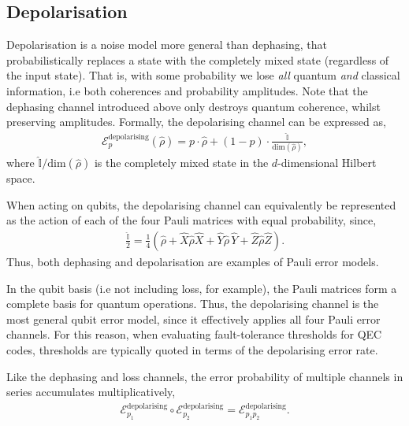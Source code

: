 %
%

\subsection{Depolarisation} 

Depolarisation is a noise model more general than dephasing, that probabilistically replaces a state with the completely mixed state (regardless of the input state). That is, with some probability we lose \textit{all} quantum \textit{and} classical information, i.e both coherences and probability amplitudes. Note that the dephasing channel introduced above only destroys quantum coherence, whilst preserving amplitudes. Formally, the depolarising channel can be expressed as,
\begin{align} \label{eq:depolarizing_channel}
\mathcal{E}^\mathrm{depolarising}_p(\hat\rho) = p \cdot \hat\rho + (1-p)\cdot \frac{\mathbb{\hat{I}}}{\mathrm{dim}(\hat\rho)},
\end{align}
where $\mathbb{\hat{I}}/\mathrm{dim}(\hat\rho)$ is the completely mixed state in the $d$-dimensional Hilbert space.

When acting on qubits, the depolarising channel can equivalently be represented as the action of each of the four Pauli matrices with equal probability, since,
\begin{align}
\frac{\mathbb{\hat{I}}}{2} = \frac{1}{4}(\hat\rho + \hat{X}\hat\rho\hat{X} + \hat{Y}\hat\rho\,\hat{Y} + \hat{Z}\hat\rho\hat{Z}).
\end{align}
Thus, both dephasing and depolarisation are examples of Pauli error models.

In the qubit basis (i.e not including loss, for example), the Pauli matrices form a complete basis for quantum operations. Thus, the depolarising channel is the most general qubit error model, since it effectively applies all four Pauli error channels. For this reason, when evaluating fault-tolerance thresholds for QEC codes, thresholds are typically quoted in terms of the depolarising error rate.

Like the dephasing and loss channels, the error probability of multiple channels in series accumulates multiplicatively,
\begin{align}
\mathcal{E}_{p_1}^\mathrm{depolarising} \circ \mathcal{E}_{p_2}^\mathrm{depolarising} = \mathcal{E}_{p_1 p_2}^\mathrm{depolarising}.
\end{align}

%
%

